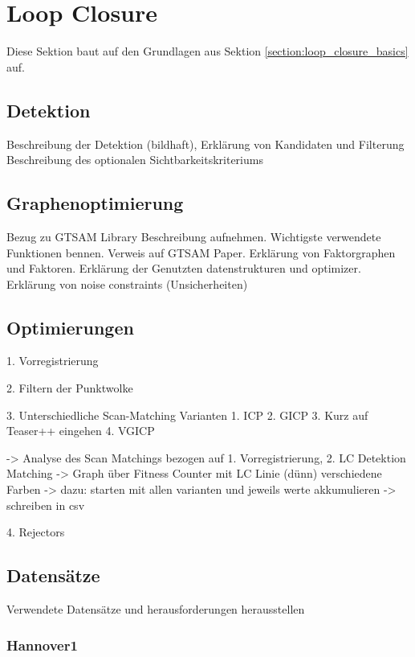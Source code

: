 \chapter{Loop Closure}
\label{chapter:loop_closure}

Diese Sektion baut auf den Grundlagen aus Sektion \ref{section:loop_closure_basics} auf.

\section{Detektion}

Beschreibung der Detektion (bildhaft), Erklärung von Kandidaten und Filterung
Beschreibung des optionalen Sichtbarkeitskriteriums

\section{Graphenoptimierung}

Bezug zu GTSAM Library Beschreibung aufnehmen.
Wichtigste verwendete Funktionen bennen.
Verweis auf GTSAM Paper.
Erklärung von Faktorgraphen und Faktoren.
Erklärung der Genutzten datenstrukturen und optimizer.
Erklärung von noise constraints (Unsicherheiten)

\section{Optimierungen}

1. Vorregistrierung

2. Filtern der Punktwolke

3. Unterschiedliche Scan-Matching Varianten
	1. ICP
	2. GICP
	3. Kurz auf Teaser++ eingehen
	4. VGICP
	
	-> Analyse des Scan Matchings bezogen auf 1. Vorregistrierung, 2. LC Detektion Matching
	-> Graph über Fitness Counter mit LC Linie (dünn) verschiedene Farben
	-> dazu: starten mit allen varianten und jeweils werte akkumulieren
	-> schreiben in csv
	
	4. Rejectors
	
\section{Datensätze}

Verwendete Datensätze und herausforderungen herausstellen

\subsection{Hannover1}

